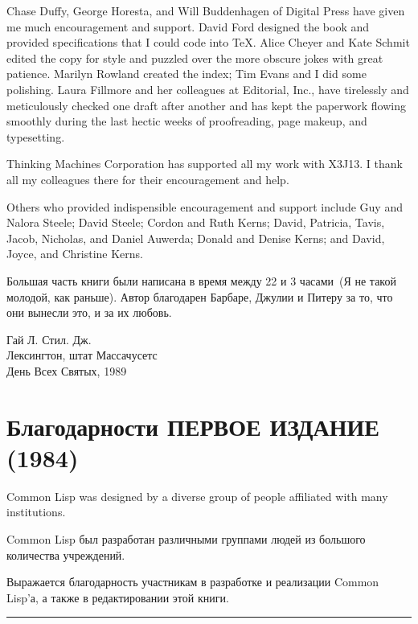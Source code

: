 Chase Duffy, George Horesta, and Will Buddenhagen of Digital Press have given me
much encouragement and support.  David Ford designed the book and
provided specifications that I could code into \TeX.
Alice Cheyer and Kate Schmit edited the copy for style
and puzzled over the more obscure jokes with great patience.
Marilyn Rowland created the index; Tim Evans and I did some polishing.
Laura Fillmore and her colleagues at Editorial, Inc., have
tirelessly and meticulously checked one draft after another and
has kept the paperwork flowing smoothly during the last hectic weeks
of proofreading, page makeup, and typesetting.

Thinking Machines Corporation has supported all my work with X3J13.
I thank all my colleagues there for their encouragement and help.

Others who provided indispensible encouragement and support include
Guy and Nalora Steele; David Steele; Cordon and Ruth Kerns;
David, Patricia, Tavis, Jacob, Nicholas, and Daniel Auwerda;
Donald and Denise Kerns; and David, Joyce, and Christine Kerns.

Большая часть книги были написана в время между 22 и 3 часами~(Я не такой
молодой, как раньше). Автор благодарен Барбаре, Джулии и Питеру за то, что они
вынесли это, и за их любовь.

\begin{tabbing}
Гай Л. Стил. Дж. \\
Лексингтон, штат Массачусетс \\
День Всех Святых, 1989
\end{tabbing}

\chapter*{Благодарности ПЕРВОЕ ИЗДАНИЕ (1984)}

Common Lisp was designed
by a diverse group of people affiliated with many institutions.

Common Lisp был разработан различными группами людей из большого количества учреждений.


Выражается благодарность участникам в разработке и реализации Common Lisp'а, а
также в редактировании этой книги.
\hrule width 0pt\relax

